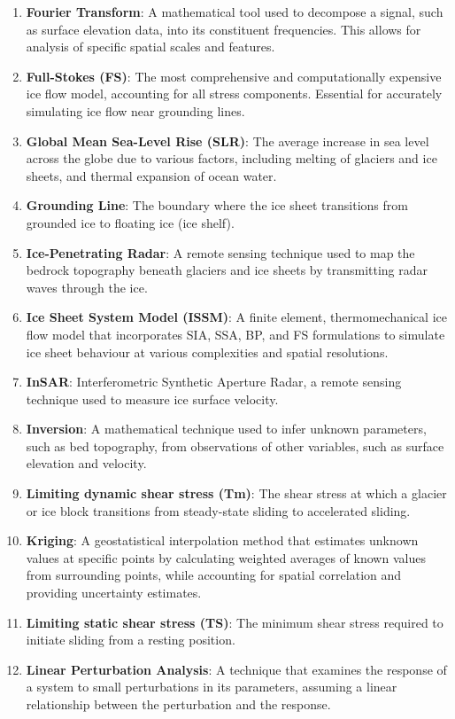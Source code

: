 \begin{enumerate}
\item \textbf{Fourier Transform}: A mathematical tool used to decompose a signal, such as surface elevation data, into its constituent frequencies. This allows for analysis of specific spatial scales and features.
\item \textbf{Full-Stokes (FS)}: The most comprehensive and computationally expensive ice flow model, accounting for all stress components. Essential for accurately simulating ice flow near grounding lines.
\item \textbf{Global Mean Sea-Level Rise (SLR)}: The average increase in sea level across the globe due to various factors, including melting of glaciers and ice sheets, and thermal expansion of ocean water.
\item \textbf{Grounding Line}: The boundary where the ice sheet transitions from grounded ice to floating ice (ice shelf).
\item \textbf{Ice-Penetrating Radar}: A remote sensing technique used to map the bedrock topography beneath glaciers and ice sheets by transmitting radar waves through the ice.
\item \textbf{Ice Sheet System Model (ISSM)}: A finite element, thermomechanical ice flow model that incorporates SIA, SSA, BP, and FS formulations to simulate ice sheet behaviour at various complexities and spatial resolutions.
\item \textbf{InSAR}: Interferometric Synthetic Aperture Radar, a remote sensing technique used to measure ice surface velocity.
\item \textbf{Inversion}: A mathematical technique used to infer unknown parameters, such as bed topography, from observations of other variables, such as surface elevation and velocity.
\item \textbf{Limiting dynamic shear stress (Tm)}: The shear stress at which a glacier or ice block transitions from steady-state sliding to accelerated sliding.
\item \textbf{Kriging}: A geostatistical interpolation method that estimates unknown values at specific points by calculating weighted averages of known values from surrounding points, while accounting for spatial correlation and providing uncertainty estimates.
\item \textbf{Limiting static shear stress (TS)}: The minimum shear stress required to initiate sliding from a resting position.
\item \textbf{Linear Perturbation Analysis}: A technique that examines the response of a system to small perturbations in its parameters, assuming a linear relationship between the perturbation and the response.

\end{enumerate}
